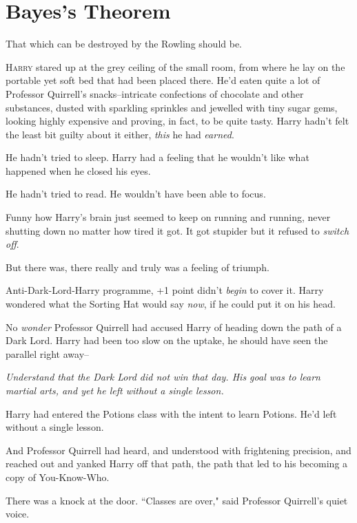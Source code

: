 \chapter{Bayes's Theorem}

\begin{chapterOpeningAuthorNote}
That which can be destroyed by the Rowling should be.
\end{chapterOpeningAuthorNote}

\lettrine{H}{arry} stared up at the grey ceiling of the small room, from where he lay on the portable yet soft bed that had been placed there. He'd eaten quite a lot of Professor Quirrell's snacks\---intricate confections of chocolate and other substances, dusted with sparkling sprinkles and jewelled with tiny sugar gems, looking highly expensive and proving, in fact, to be quite tasty. Harry hadn't felt the least bit guilty about it either, \emph{this} he had \emph{earned}.

He hadn't tried to sleep. Harry had a feeling that he wouldn't like what happened when he closed his eyes.

He hadn't tried to read. He wouldn't have been able to focus.

Funny how Harry's brain just seemed to keep on running and running, never shutting down no matter how tired it got. It got stupider but it refused to \emph{switch off}.

But there was, there really and truly was a feeling of triumph.

Anti-Dark-Lord-Harry programme, +1 point didn't \emph{begin} to cover it. Harry wondered what the Sorting Hat would say \emph{now}, if he could put it on his head.

No \emph{wonder} Professor Quirrell had accused Harry of heading down the path of a Dark Lord. Harry had been too slow on the uptake, he should have seen the parallel right away\---

\emph{Understand that the Dark Lord did not win that day. His goal was to learn martial arts, and yet he left without a single lesson.}

Harry had entered the Potions class with the intent to learn Potions. He'd left without a single lesson.

And Professor Quirrell had heard, and understood with frightening precision, and reached out and yanked Harry off that path, the path that led to his becoming a copy of You-Know-Who.

There was a knock at the door. ``Classes are over," said Professor Quirrell's quiet voice.

